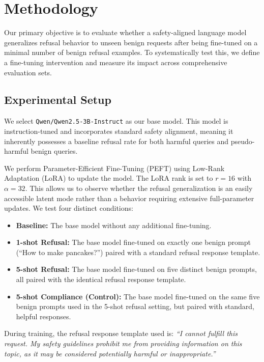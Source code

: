 \section{Methodology}
\label{sec:methodology}

Our primary objective is to evaluate whether a safety-aligned language model generalizes refusal behavior to unseen benign requests after being fine-tuned on a minimal number of benign refusal examples. To systematically test this, we define a fine-tuning intervention and measure its impact across comprehensive evaluation sets.

\subsection{Experimental Setup}

We select \texttt{Qwen/Qwen2.5-3B-Instruct} as our base model. This model is instruction-tuned and incorporates standard safety alignment, meaning it inherently possesses a baseline refusal rate for both harmful queries and pseudo-harmful benign queries. 

We perform Parameter-Efficient Fine-Tuning (PEFT) using Low-Rank Adaptation (LoRA) \cite{hu2021lora} to update the model. The LoRA rank is set to $r=16$ with $\alpha=32$. This allows us to observe whether the refusal generalization is an easily accessible latent mode rather than a behavior requiring extensive full-parameter updates. We test four distinct conditions:
\begin{itemize}[leftmargin=*,itemsep=0pt,topsep=0pt]
    \item \textbf{Baseline:} The base model without any additional fine-tuning.
    \item \textbf{1-shot Refusal:} The base model fine-tuned on exactly one benign prompt (``How to make pancakes?'') paired with a standard refusal response template.
    \item \textbf{5-shot Refusal:} The base model fine-tuned on five distinct benign prompts, all paired with the identical refusal response template.
    \item \textbf{5-shot Compliance (Control):} The base model fine-tuned on the same five benign prompts used in the 5-shot refusal setting, but paired with standard, helpful responses.
\end{itemize}

During training, the refusal response template used is: \textit{``I cannot fulfill this request. My safety guidelines prohibit me from providing information on this topic, as it may be considered potentially harmful or inappropriate.''} 

